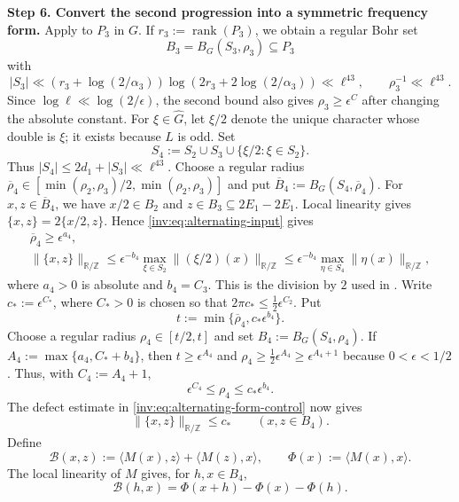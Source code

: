 \documentclass[twoside]{aomart}
\makeatletter
\theoremstyle{paperplain}
\theoremstyle{paperdefinition}
\renewenvironment{proof}[1][\proofname]{\par\pushQED{\qed}%
  \normalfont\topsep6\p@\@plus3\p@\relax\trivlist
  \item[\hskip\labelsep\itshape #1\@addpunct{.}]\ignorespaces
}{\popQED\endtrivlist\@endpefalse}
\numberwithin{equation}{section}
\makeatother
\begin{document}
\begin{proof}
\par
\medskip
\noindent\textbf{Step 6. Convert the second progression into a symmetric
frequency form.}
Apply  to $P_3$ in $G$. If
$r_3:=\operatorname{rank}(P_3)$, we obtain a regular Bohr set
\[
 B_3=B_G(S_3,\rho_3)\subseteq P_3
\]
with
\begin{equation*}
 |S_3|\ll(r_3+\log(2/\alpha_3))
 \log(2r_3+2\log(2/\alpha_3))\ll\ell^{43},
 \qquad \rho_3^{-1}\ll\ell^{43}.
\end{equation*}
Since $\log\ell\ll\log(2/\epsilon)$, the second bound also gives
$\rho_3\ge\epsilon^C$ after changing the absolute constant.
For $\xi\in\widehat G$, let $\xi/2$ denote the unique character
whose double is $\xi$; it exists because $L$ is odd. Set
\[
 S_4:=S_2\cup S_3\cup\{\xi/2:\xi\in S_2\}.
\]
Thus $|S_4|\le2d_1+|S_3|\ll\ell^{43}$. Choose a regular radius
$\overline\rho_4\in[\min(\rho_2,\rho_3)/2,\min(\rho_2,\rho_3)]$
and put $\overline B_4:=B_G(S_4,\overline\rho_4)$.
For $x,z\in\overline B_4$, we have $x/2\in B_2$ and
$z\in B_3\subseteq2E_1-2E_1$. Local linearity gives
$\{x,z\}=2\{x/2,z\}$. Hence \eqref{inv:eq:alternating-input} gives
\begin{equation}
 \begin{gathered}
 \overline\rho_4\ge\epsilon^{a_4},\\
 \|\{x,z\}\|_{\mathbb R/\mathbb Z}
 \le\epsilon^{-b_4}\max_{\xi\in S_2}
       \|(\xi/2)(x)\|_{\mathbb R/\mathbb Z}
 \le\epsilon^{-b_4}\max_{\eta\in S_4}
       \|\eta(x)\|_{\mathbb R/\mathbb Z},
 \end{gathered}
 \label{inv:eq:alternating-form-control}
\end{equation}
where $a_4>0$ is absolute and $b_4=C_3$. This is the division by $2$
used in \cite[Appendix~A.3]{LengQuadratic}.
Write $c_*:=\epsilon^{C_*}$, where $C_*>0$ is chosen so
that $2\pi c_*\le\tfrac12\epsilon^{C_2}$. Put
\[
 t:=\min\{\overline\rho_4,c_*\epsilon^{b_4}\}.
\]
Choose a regular radius $\rho_4\in[t/2,t]$ and set
$B_4:=B_G(S_4,\rho_4)$. If
$A_4:=\max\{a_4,C_*+b_4\}$, then
$t\ge\epsilon^{A_4}$ and
$\rho_4\ge\tfrac12\epsilon^{A_4}\ge\epsilon^{A_4+1}$ because
$0<\epsilon<1/2$. Thus, with $C_4:=A_4+1$,
\begin{equation}
 \epsilon^{C_4}\le\rho_4\le c_*\epsilon^{b_4}.
 \label{inv:eq:alternating-form-radius}
\end{equation}
The defect estimate in \eqref{inv:eq:alternating-form-control} now gives
\[
 \|\{x,z\}\|_{\mathbb R/\mathbb Z}\le c_*
 \qquad(x,z\in B_4).
\]
Define
\[
 \mathcal B(x,z):=\langle M(x),z\rangle+\langle M(z),x\rangle,
 \qquad \Phi(x):=\langle M(x),x\rangle.
\]
The local linearity of $M$ gives, for $h,x\in B_4$,
\begin{equation}
 \mathcal B(h,x)=\Phi(x+h)-\Phi(x)-\Phi(h).
 \label{inv:eq:symmetric-phase}
\end{equation}


\end{proof}
\end{document}
